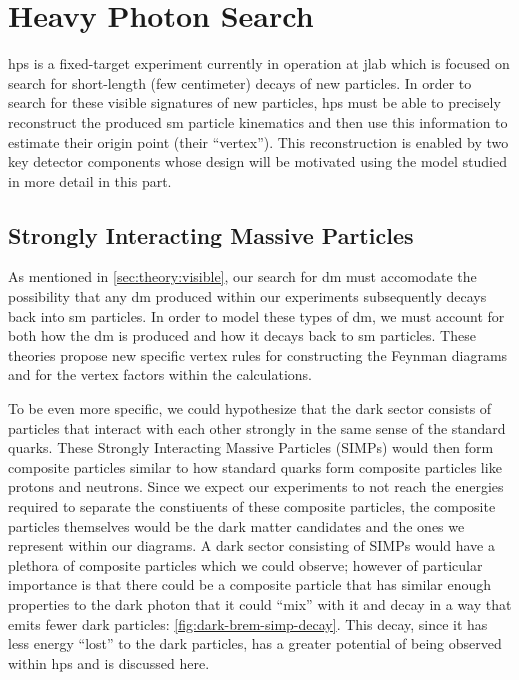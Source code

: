 \chapter{Heavy Photon Search}
\label{chapter:hps:experiment}

\acf{hps} is a fixed-target experiment currently in operation at \ac{jlab}
which is focused on search for short-length (few centimeter) decays of new particles.
In order to search for these visible signatures of new particles,
\ac{hps} must be able to precisely reconstruct the produced \ac{sm} particle
kinematics and then use this information to estimate their origin point (their
``vertex'').
This reconstruction is enabled by two key detector components whose design
will be motivated using the model studied in more detail in this part.

\section{Strongly Interacting Massive Particles}
\label{sec:hps:simps}

As mentioned in \cref{sec:theory:visible}, our search for \ac{dm} must accomodate the
possibility that any \ac{dm} produced within our experiments subsequently decays back
into \ac{sm} particles.
In order to model these types of \ac{dm}, we must account for both how the \ac{dm} is
produced and how it decays back to \ac{sm} particles.
These theories propose new specific vertex rules for constructing the Feynman diagrams
and for the vertex factors within the calculations.

To be even more specific, we could hypothesize that the dark sector consists of particles that
interact with each other strongly in the same sense of the standard quarks.
These Strongly Interacting Massive Particles (SIMPs) \cite{simp-mechanism-2014,simp-pheno-2018}
would then form composite particles similar to how standard quarks form composite particles
like protons and neutrons.
Since we expect our experiments to not reach the energies required to separate the constiuents
of these composite particles, the composite particles themselves would be the dark matter candidates
and the ones we represent within our diagrams.
A dark sector consisting of SIMPs would have a plethora of composite particles which we could observe;
however of particular importance is that there could be a composite particle that has similar enough
properties to the dark photon that it could ``mix'' with it and decay in a way that emits fewer dark
particles: \cref{fig:dark-brem-simp-decay}.
This decay, since it has less energy ``lost'' to the dark particles,
has a greater potential of being observed within \ac{hps} and is discussed here.

